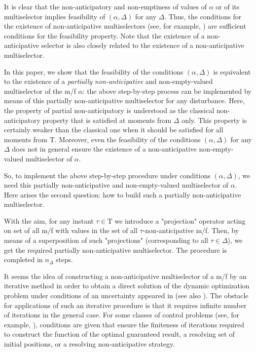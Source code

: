 \documentclass[sn-mathphys,Numbered,pdflatex]{sn-jnl}%
\theoremstyle{thmstyleone}%
\theoremstyle{thmstyletwo}%
\theoremstyle{thmstylethree}%
\newcommand{\naT}{\ensuremath{\mathrm{T}}}%
\begin{document}
It is clear that the non-anticipatory and non-emptiness of values of $\alpha$ or of its multiselector implies feasibility of $(\alpha, \Delta)$ for any $\Delta$.
Thus, the conditions for the existence of non-anticipative multiselectors (see, for example, \cite{Chentsov2001DEI, Chentsov2001DEII,Ser_UDSU2017}) are sufficient conditions for the feasibility property.
Note that the existence of a non-anticipative selector \cite{Chentsov1978dep-e,CARDALIAGUET-PLASKACZ-SIAM2000,CheSer_TRIMM2019et} is also closely related to the existence of a non-anticipative multiselector.

In this paper, we show that the feasibility of the conditions $(\alpha, \Delta)$ is equivalent to the existence of a \emph{partially non-anticipative} and non-empty-valued multiselector of the  m/f $\alpha$:
the above step-by-step process can be implemented by means of this  partially non-anticipative multiselector for any disturbance.
Here, the property of partial non-anticipatory is understood as the classical non-anticipatory property that is satisfied at moments from $\Delta$ only.
This property is certainly weaker than the classical one when it should be satisfied for all moments from $\naT$.
Moreover, even the feasibility of the conditions $(\alpha, \Delta)$ for any $\Delta$ does not in general ensure the existence of a non-anticipative non-empty-valued multiselector of $\alpha$.

So, to implement the above step-by-step procedure under conditions $(\alpha, \Delta)$, we need this partially non-anticipative and non-empty-valued multiselector of $\alpha$.
Here arises the second question: how to build such a partially non-anticipative multiselector.

With the aim, for any instant $\tau\in\naT$ we introduce a "projection" operator acting on set of all m/f with values in the set of all $\tau$-non-anticipative m/f.
Then, by means of a  superposition of such "projections" (corresponding to all $\tau\in\Delta$), we get the required partially non-anticipative multiselector.
The procedure is completed in $n_\Delta$ steps.

It seems the idea of constructing a non-anticipative multiselector of a m/f by an iterative method in order to obtain a direct solution of the dynamic optimization problem under conditions of an uncertainty appeared in \cite{Chentsov1997DAN} (see also \cite{Chentsov2001DEI, Chentsov2001DEII}).
The obstacle for applications of such an iterative procedure is that it requires infinite number of iterations in the general case.
For some classes of control problems (see, for example, \cite[ch.\,5]{SubChe81e}), conditions are given that ensure the finiteness of iterations required to construct the function of the optimal guaranteed result, a resolving set of initial positions, or a resolving non-anticipative strategy.
\end{document}
